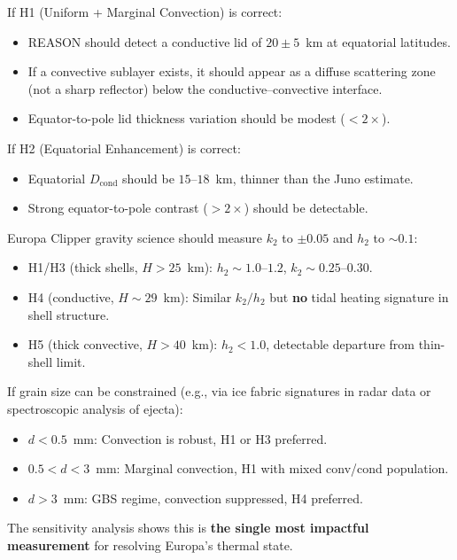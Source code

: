 \documentclass[11pt,letterpaper]{article}
\begin{document}
\begin{predictionbox}
If H1 (Uniform + Marginal Convection) is correct:
\begin{itemize}[nosep]
  \item REASON should detect a conductive lid of $20 \pm 5$~km at equatorial latitudes.
  \item If a convective sublayer exists, it should appear as a diffuse scattering zone (not a sharp reflector) below the conductive--convective interface.
  \item Equator-to-pole lid thickness variation should be modest ($< 2\times$).
\end{itemize}
If H2 (Equatorial Enhancement) is correct:
\begin{itemize}[nosep]
  \item Equatorial $D_\mathrm{cond}$ should be $15$--$18$~km, thinner than the Juno estimate.
  \item Strong equator-to-pole contrast ($> 2\times$) should be detectable.
\end{itemize}
\end{predictionbox}

\begin{predictionbox}
Europa Clipper gravity science should measure $k_2$ to $\pm 0.05$ and $h_2$ to $\sim 0.1$:
\begin{itemize}[nosep]
  \item H1/H3 (thick shells, $H > 25$~km): $h_2 \sim 1.0$--$1.2$, $k_2 \sim 0.25$--$0.30$.
  \item H4 (conductive, $H \sim 29$~km): Similar $k_2/h_2$ but \textbf{no} tidal heating signature in shell structure.
  \item H5 (thick convective, $H > 40$~km): $h_2 < 1.0$, detectable departure from thin-shell limit.
\end{itemize}
\end{predictionbox}

\begin{predictionbox}
If grain size can be constrained (e.g., via ice fabric signatures in radar data or spectroscopic analysis of ejecta):
\begin{itemize}[nosep]
  \item $d < 0.5$~mm: Convection is robust, H1 or H3 preferred.
  \item $0.5 < d < 3$~mm: Marginal convection, H1 with mixed conv/cond population.
  \item $d > 3$~mm: GBS regime, convection suppressed, H4 preferred.
\end{itemize}
The sensitivity analysis shows this is \textbf{the single most impactful measurement} for resolving Europa's thermal state.
\end{predictionbox}
\end{document}
